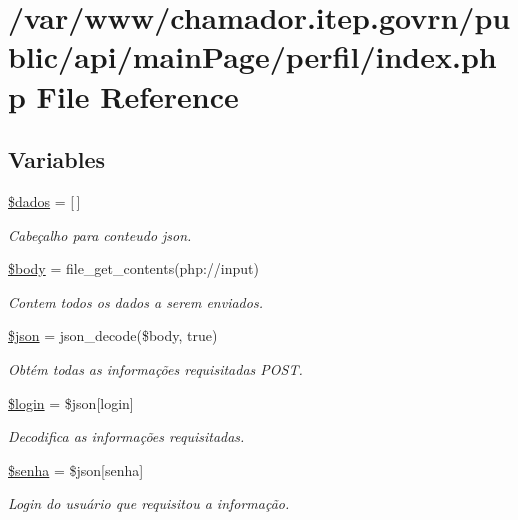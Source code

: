 \hypertarget{main_page_2perfil_2index_8php}{}\section{/var/www/chamador.itep.\+govrn/public/api/main\+Page/perfil/index.php File Reference}
\label{main_page_2perfil_2index_8php}
\subsection*{Variables}
\begin{DoxyCompactItemize}
\item 
\hyperlink{main_page_2perfil_2index_8php_a252370d95039a38fa11afab784725d58}{\$dados} = \mbox{[}$\,$\mbox{]}
\begin{DoxyCompactList}\small\item\em Cabeçalho para conteudo json. \end{DoxyCompactList}\item 
\hyperlink{main_page_2perfil_2index_8php_a26b9f9373f7bb79dfcf8a86dff086b45}{\$body} = file\+\_\+get\+\_\+contents(\textquotesingle{}php\+://input\textquotesingle{})
\begin{DoxyCompactList}\small\item\em Contem todos os dados a serem enviados. \end{DoxyCompactList}\item 
\hyperlink{main_page_2perfil_2index_8php_acedd13b51401130848ce18f4d5c52605}{\$json} = json\+\_\+decode(\$body, true)
\begin{DoxyCompactList}\small\item\em Obtém todas as informações requisitadas P\+O\+ST. \end{DoxyCompactList}\item 
\hyperlink{main_page_2perfil_2index_8php_afc31993e855f9631572adfedcfe6f34b}{\$login} = \$json\mbox{[}\textquotesingle{}login\textquotesingle{}\mbox{]}
\begin{DoxyCompactList}\small\item\em Decodifica as informações requisitadas. \end{DoxyCompactList}\item 
\hyperlink{main_page_2perfil_2index_8php_a3678c8769c9698fd30581c1016c5f475}{\$senha} = \$json\mbox{[}\textquotesingle{}senha\textquotesingle{}\mbox{]}
\begin{DoxyCompactList}\small\item\em Login do usuário que requisitou a informação. \end{DoxyCompactList}\item 

\end{DoxyCompactItemize}
